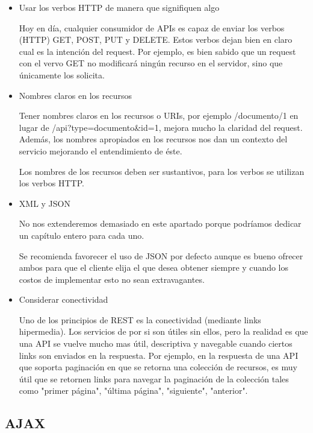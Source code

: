 \begin{itemize}

	\item Usar los verbos HTTP de manera que signifiquen algo
	
	Hoy en día, cualquier consumidor de APIs es capaz de enviar los verbos (HTTP) GET, 
	POST, PUT y DELETE. Estos verbos dejan bien en claro cual es la intención del request. 
	Por ejemplo, es bien sabido que un request con el vervo GET no modificará ningún 
	recurso en el servidor, sino que únicamente los solicita.
	
	\item Nombres claros en los recursos
	
	Tener nombres claros en los recursos o URIs, por ejemplo /documento/1 en lugar de 
	/api?type=documento&id=1, mejora mucho la claridad del request. Además, los nombres 
	apropiados en los recursos nos dan un contexto del servicio mejorando el entendimiento 
	de éste. 
	
	Los nombres de los recursos deben ser sustantivos, para los verbos se utilizan los 
	verbos HTTP.
	
	\item XML y JSON
	
	No nos extenderemos demasiado en este apartado porque podríamos dedicar un capítulo 
	entero para cada uno.
	
	Se recomienda favorecer el uso de JSON por defecto aunque es bueno ofrecer ambos para 
	que el cliente elija el que desea obtener siempre y cuando los costos de implementar 
	esto no sean extravagantes.
	
	\item Considerar conectividad
	
	Uno de los principios de REST es la conectividad (mediante links hipermedia). Los 
	servicios de por si son útiles sin ellos, pero la realidad es que una API se vuelve 
	mucho mas útil, descriptiva y navegable cuando ciertos links son enviados en la 
	respuesta. Por ejemplo, en la respuesta de una API que soporta paginación en que se 
	retorna una colección de recursos, es muy útil que se retornen links para navegar 
	la paginación de la colección tales como "primer página", "última página", 
	"siguiente", "anterior".

\end{itemize}

 
\subsection{AJAX}

